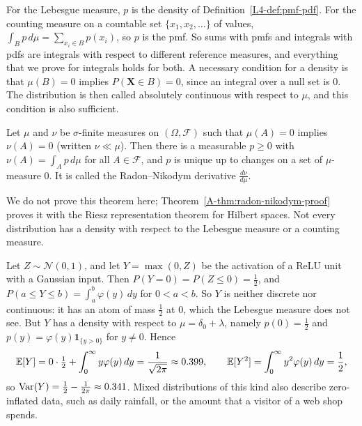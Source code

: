 For the Lebesgue measure, $p$ is the density of Definition~\ref{L4-def:pmf-pdf}. For the counting measure on a countable set $\{x_1, x_2, \ldots\}$ of values, $\int_B p\, d\mu = \sum_{x_i \in B} p(x_i)$, so $p$ is the pmf. So sums with pmfs and integrals with pdfs are integrals with respect to different reference measures, and everything that we prove for integrals holds for both. A necessary condition for a density is that $\mu(B) = 0$ implies $P(\mathbf{X} \in B) = 0$, since an integral over a null set is $0$. The distribution is then called absolutely continuous with respect to $\mu$, and this condition is also sufficient.

\begin{theorem}\label{B-thm:radon-nikodym}
    Let $\mu$ and $\nu$ be $\sigma$-finite measures on $(\Omega, \mathcal{F})$ such that $\mu(A) = 0$ implies $\nu(A) = 0$ (written $\nu \ll \mu$). Then there is a measurable $p \geq 0$ with $\nu(A) = \int_A p\, d\mu$ for all $A \in \mathcal{F}$, and $p$ is unique up to changes on a set of $\mu$-measure $0$. It is called the Radon--Nikodym derivative $\frac{d\nu}{d\mu}$.
\end{theorem}

We do not prove this theorem here; Theorem~\ref{A-thm:radon-nikodym-proof} proves it with the Riesz representation theorem for Hilbert spaces. Not every distribution has a density with respect to the Lebesgue measure or a counting measure.

\begin{example}\label{B-ex:relu-gaussian}
    Let $Z \sim \mathcal{N}(0, 1)$, and let $Y = \max(0, Z)$ be the activation of a ReLU unit with a Gaussian input. Then $P(Y = 0) = P(Z \leq 0) = \frac{1}{2}$, and $P(a \leq Y \leq b) = \int_a^b \varphi(y)\, dy$ for $0 < a < b$. So $Y$ is neither discrete nor continuous: it has an atom of mass $\frac{1}{2}$ at $0$, which the Lebesgue measure does not see. But $Y$ has a density with respect to $\mu = \delta_0 + \lambda$, namely $p(0) = \frac{1}{2}$ and $p(y) = \varphi(y)\mathbf{1}_{\{y > 0\}}$ for $y \neq 0$. Hence
    \[\mathbb{E}[Y] = 0 \cdot \tfrac{1}{2} + \int_0^\infty y\varphi(y)\, dy = \frac{1}{\sqrt{2\pi}} \approx 0.399, \qquad \mathbb{E}[Y^2] = \int_0^\infty y^2\varphi(y)\, dy = \frac{1}{2},\]
    so $\operatorname{Var}(Y) = \frac{1}{2} - \frac{1}{2\pi} \approx 0.341$. Mixed distributions of this kind also describe zero-inflated data, such as daily rainfall, or the amount that a visitor of a web shop spends.
\end{example}

